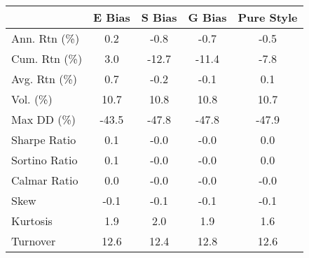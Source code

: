 \begin{tabular}{lcccc}
\toprule
 & E Bias & S Bias & G Bias & Pure Style \\
\midrule
Ann. Rtn (\%) & 0.2 & -0.8 & -0.7 & -0.5 \\
Cum. Rtn (\%) & 3.0 & -12.7 & -11.4 & -7.8 \\
Avg. Rtn (\%) & 0.7 & -0.2 & -0.1 & 0.1 \\
Vol. (\%) & 10.7 & 10.8 & 10.8 & 10.7 \\
Max DD (\%) & -43.5 & -47.8 & -47.8 & -47.9 \\
Sharpe Ratio & 0.1 & -0.0 & -0.0 & 0.0 \\
Sortino Ratio & 0.1 & -0.0 & -0.0 & 0.0 \\
Calmar Ratio & 0.0 & -0.0 & -0.0 & -0.0 \\
Skew & -0.1 & -0.1 & -0.1 & -0.1 \\
Kurtosis & 1.9 & 2.0 & 1.9 & 1.6 \\
Turnover & 12.6 & 12.4 & 12.8 & 12.6 \\
\bottomrule
\end{tabular}
